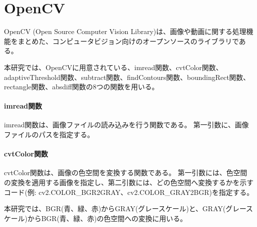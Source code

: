 \section{OpenCV}\label{sec:opencv}
OpenCV (Open Source Computer Vision Library)は、画像や動画に関する処理機能をまとめた、コンピュータビジョン向けのオープンソースのライブラリである\cite{OpenCV}。
\par
本研究では、OpenCVに用意されている、imread関数、cvtColor関数、adaptiveThreshold関数、subtract関数、findContours関数、boundingRect関数、rectangle関数、absdiff関数の8つの関数を用いる。
\paragraph{imread関数}
imread関数は、画像ファイルの読み込みを行う関数である。
第一引数に、画像ファイルのパスを指定する。
\paragraph{cvtColor関数}
cvtColor関数は、画像の色空間を変換する関数である。
第一引数には、色空間の変換を適用する画像を指定し、第二引数には、どの色空間へ変換するかを示すコード(例: cv2.COLOR\_BGR2GRAY、cv2.COLOR\_GRAY2BGR)を指定する。
\par
本研究では、BGR(青、緑、赤)からGRAY(グレースケール)と、GRAY(グレースケール)からBGR(青、緑、赤)の色空間への変換に用いる。
